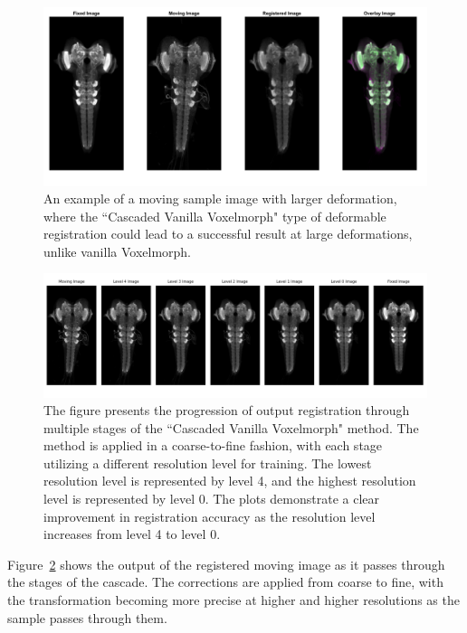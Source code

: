\documentclass{book}
\begin{document}
	\begin{figure}[h!]
		\centering
		\includegraphics[width=0.9\columnwidth]{resources/chapter4/Method3/compare/np_60H12_14E09_MB049B_020113B_scaled.tif.png}
		\caption{An example of a moving sample image with larger deformation, where the ``Cascaded Vanilla Voxelmorph" type of deformable registration could lead to a successful result at large deformations, unlike vanilla Voxelmorph.}
		\label{fig:Cascaded Vanilla Voxelmorph_fail}
	\end{figure}
	
	\begin{figure}[h!]
		\centering
		\includegraphics[width=0.9\columnwidth]{resources/chapter4/Method3/np_60H12_14E09_MB049B_020113B_scaled.png}
		\caption{The figure presents the progression of output registration through multiple stages of the ``Cascaded Vanilla Voxelmorph" method. The method is applied in a coarse-to-fine fashion, with each stage utilizing a different resolution level for training. The lowest resolution level is represented by level 4, and the highest resolution level is represented by level 0. The plots demonstrate a clear improvement in registration accuracy as the resolution level increases from level 4 to level 0.}
		\label{fig:Cascaded Vanilla Voxelmorph_cascade}
	\end{figure}
	
	Figure~\ref{fig:Cascaded Vanilla Voxelmorph_cascade} shows the output of the registered moving image as it passes through the stages of the cascade. The corrections are applied from coarse to fine, with the transformation becoming more precise at higher and higher resolutions as the sample passes through them.
	
\end{document}

